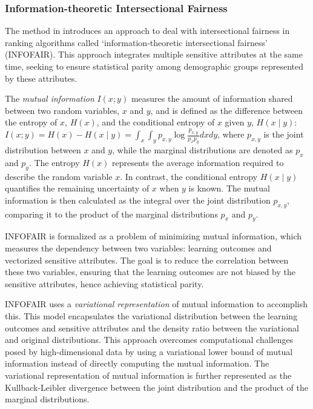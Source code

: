 \subsubsection{Information-theoretic Intersectional Fairness}
\label{subsubsec:intrank_meth__other_extra_21n}

The method in \cite{kang2022infofair} introduces an approach to deal with intersectional fairness in ranking algorithms called `information-theoretic intersectional fairness' (INFOFAIR). This approach integrates multiple sensitive attributes at the same time, seeking to ensure statistical parity among demographic groups represented by these attributes.
 
The \emph{mutual information} $I(x ; y)$
measures the amount of information shared between two random variables, $x$ and $y$, and is defined as the difference between the entropy of $x$, $H(x)$, and the conditional entropy of $x$ given $y$, $H(x \mid y)$: 
$I(x ; y)=H(x)-H(x \mid y)=\int_x \int_y p_{x, y} \log \frac{p_{x, y}}{p_x p_y} d x d y$,
where $p_{x,y}$ is the joint distribution between $x$ and $y$, while the marginal distributions are denoted as $p_x$ and $p_y$. 
 The entropy $H(x)$ represents the average information required to describe the random variable $x$. In contrast, the conditional entropy $H(x \mid y)$ quantifies the remaining uncertainty of $x$ when $y$ is known. The mutual information is then calculated as the integral over the joint distribution $p_{x,y}$, comparing it to the product of the marginal distributions $p_x$ and $p_y$.


INFOFAIR is formalized as a problem of minimizing mutual information, which measures the dependency between two variables: learning outcomes and vectorized sensitive attributes.
The goal is to reduce the correlation between these two variables, ensuring that the learning outcomes are not biased by the sensitive attributes, hence achieving statistical parity.


INFOFAIR uses a \emph{variational representation} of mutual information to accomplish this. This model encapsulates the variational distribution between the learning outcomes and sensitive attributes and the density ratio between the variational and original distributions. This approach overcomes computational challenges posed by high-dimensional data by using a variational lower bound of mutual information instead of directly computing the mutual information. The variational representation of mutual information is further represented as the Kullback-Leibler 
divergence between the joint distribution and the product of the marginal distributions.

